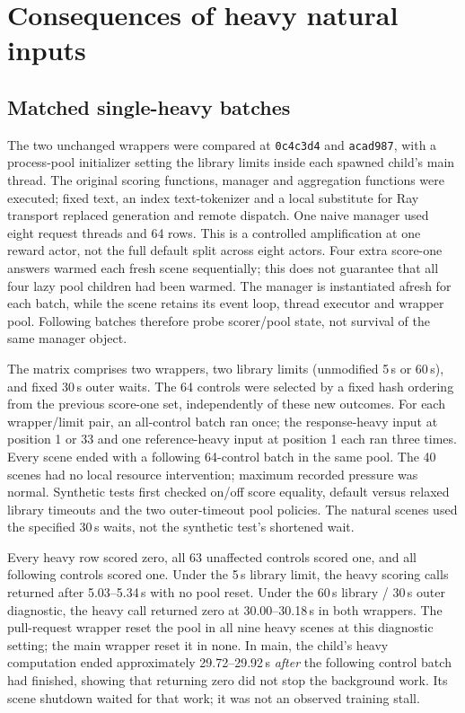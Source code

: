\documentclass[10pt,a4paper]{article}
\begin{document}
\section{Consequences of heavy natural inputs}
\label{sec:consequences}
\subsection{Matched single-heavy batches}

The two unchanged wrappers were compared at \texttt{0c4c3d4} and
\texttt{acad987}, with a process-pool initializer setting the library limits
inside each spawned child's main thread. The original scoring functions,
manager and aggregation functions were executed; fixed text, an index
text-tokenizer and a local substitute for Ray transport replaced generation
and remote dispatch. One naive manager used eight request threads and
64 rows. This is a controlled amplification at one reward actor, not the
full default split across eight actors. Four extra score-one answers warmed
each fresh scene sequentially; this does not guarantee that all four lazy
pool children had been warmed.
The manager is instantiated afresh for each batch, while the scene retains
its event loop, thread executor and wrapper pool. Following batches therefore
probe scorer/pool state, not survival of the same manager object.

The matrix comprises two wrappers, two library limits (unmodified 5\,s or
60\,s), and fixed 30\,s outer waits. The 64 controls were selected by a
fixed hash ordering from the previous score-one set, independently of these
new outcomes. For each wrapper/limit pair, an all-control batch ran once;
the response-heavy input at position 1 or 33 and one reference-heavy
input at position 1 each ran three times. Every scene ended with a following
64-control batch in the same pool. The 40 scenes had no local resource
intervention; maximum recorded pressure was normal. Synthetic tests first
checked on/off score equality, default versus relaxed library timeouts and
the two outer-timeout pool policies. The natural scenes used the specified
30\,s waits, not the synthetic test's shortened wait.

Every heavy row scored zero, all 63 unaffected controls scored one, and all
following controls scored one. Under the 5\,s library limit, the heavy
scoring calls returned after 5.03--5.34\,s with no pool reset. Under the
60\,s library / 30\,s outer diagnostic, the heavy call returned zero at
30.00--30.18\,s in both wrappers. The pull-request wrapper reset the pool
in all nine heavy scenes at this diagnostic setting; the main wrapper reset
it in none. In main, the child's heavy computation ended approximately
29.72--29.92\,s \emph{after} the following control batch had finished,
showing that returning zero did not stop the background work. Its scene
shutdown waited for that work; it was not an observed training stall.
\end{document}

